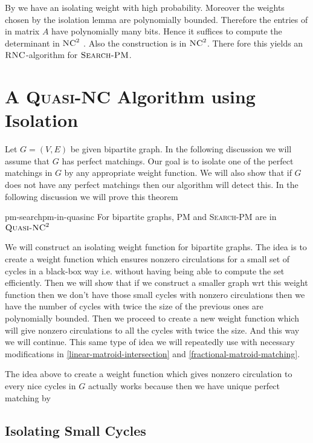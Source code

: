 By 	we have an isolating weight with high probability. Moreover the weights chosen by the isolation lemma are polynomially bounded. Therefore the entries of in matrix $A$ have polynomially many bits. Hence it suffices to compute the determinant in $\textsc{NC}^2$ \cite{Berkowitz_1984_Oct}. Also the construction is in $\textsc{NC}^2$. There fore this yields an $\textsc{RNC}$-algorithm for $\textsc{Search-PM}$.

\section{A \textsc{Quasi-NC} Algorithm using Isolation}\label{quasinc-bipartite-pm}
Let $G=(V,E)$ be given bipartite graph. In the following discussion we will assume that $G$ has perfect matchings. Our goal is to isolate one of the perfect matchings in $G$ by any appropriate weight function. We will also show that if $G$ does not have any perfect matchings then our algorithm will detect this. In the following discussion we will prove this theorem
\begin{Theorem}{\cite[Theorem 3.1]{FennerGurjarThierauf_2016_Bpm_CONF}}{pm-searchpm-in-quasinc}
	For bipartite graphs, \textsc{PM} and \textsc{Search-PM} are in $\textsc{Quasi-NC}^2$
\end{Theorem}

We will construct an isolating weight function for bipartite graphs. The idea is to create a weight function which ensures nonzero circulations for a small set of cycles in a black-box way i.e. without having being able to compute the set efficiently. Then we will show that if we construct a smaller graph wrt this weight function then we don't have those small cycles with nonzero circulations then we have the number of cycles with twice the size of the previous ones are polynomially bounded. Then we proceed to create a new weight function which will give nonzero circulations to all the cycles with twice the size. And this way we will continue. This same type of idea we will repeatedly use with necessary modifications in \autoref{linear-matroid-intersection} and \autoref{fractional-matroid-matching}.

The idea above to create a weight function which gives nonzero circulation to every nice cycles in $G$ actually works because  then we have unique perfect matching by 
\subsection{Isolating Small Cycles}

